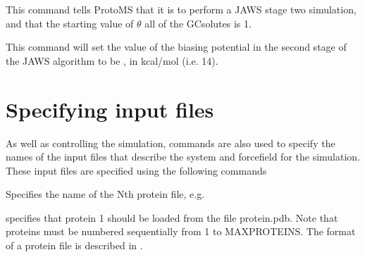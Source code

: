 \documentclass[letterpaper,10pt,english]{sphinxmanual}
\begin{document}
\ignorespaces 
\def\sphinxLiteralBlockLabel{\label{\detokenize{protoms:index-61}}}
%
\begin{sphinxVerbatim}[commandchars=\\\{\}]
 
\end{sphinxVerbatim}

This command tells ProtoMS that it is to perform a JAWS stage two simulation, and that the starting value of \(\theta\) all of the GCsolutes is 1.

\ignorespaces 
\def\sphinxLiteralBlockLabel{\label{\detokenize{protoms:index-62}}}
%
\begin{sphinxVerbatim}[commandchars=\\\{\}]
 
\end{sphinxVerbatim}

This command will set the value of the biasing potential in the second stage of the JAWS algorithm to be , in kcal/mol (i.e. 14).


\section{Specifying input files}
\label{\detokenize{protoms:specifying-input-files}}\label{\detokenize{protoms:incmd}}
As well as controlling the simulation, commands are also used to specify the names of the input files that describe the system and forcefield for the simulation. These input files are specified using the following commands

\ignorespaces 
\def\sphinxLiteralBlockLabel{\label{\detokenize{protoms:index-63}}}
%
\begin{sphinxVerbatim}[commandchars=\\\{\}]
 
\end{sphinxVerbatim}

Specifies the name of the Nth protein file, e.g.

%
\begin{sphinxVerbatim}[commandchars=\\\{\}]
 
\end{sphinxVerbatim}

specifies that protein 1 should be loaded from the file protein.pdb. Note that proteins must be numbered sequentially from 1 to MAXPROTEINS. The format of a protein file is described in {\hyperref[\detokenize{protoms:protpdb}]{}}.
\end{document}
